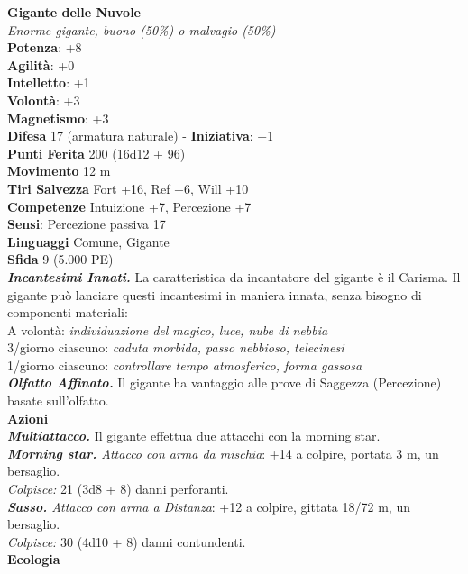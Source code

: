 \begin{multicols}{2}
\medskip\textbf{Gigante delle Nuvole}\\
\emph{Enorme gigante, buono (50\%) o malvagio (50\%)}\\
\textbf{Potenza}: +8 \\
\textbf{Agilità}: +0\\
\textbf{Intelletto}: +1\\
\textbf{Volontà}: +3\\
\textbf{Magnetismo}: +3\\
\textbf{Difesa} 17 (armatura naturale) - \textbf{Iniziativa}: +1\\
\textbf{Punti Ferita} 200 (16d12 + 96)\\
\textbf{Movimento} 12 m\\
\textbf{Tiri Salvezza} Fort +16, Ref +6, Will +10\\
\textbf{Competenze} Intuizione +7, Percezione +7\\
\textbf{Sensi}: Percezione passiva 17\\
\textbf{Linguaggi} Comune, Gigante\\
\textbf{Sfida} 9 (5.000 PE)\smallskip\\
\emph{\textbf{Incantesimi Innati.}} La caratteristica da incantatore del gigante è il Carisma. Il gigante può lanciare questi incantesimi in maniera innata, senza bisogno di componenti materiali:\\
A volontà: \emph{individuazione del magico, luce, nube di nebbia}\\
3/giorno ciascuno: \emph{caduta morbida, passo nebbioso, telecinesi}\\
1/giorno ciascuno: \emph{controllare tempo atmosferico, forma gassosa}\\
\emph{\textbf{Olfatto Affinato.}} Il gigante ha vantaggio alle prove di Saggezza (Percezione) basate sull'olfatto.\\
\smallskip\textbf{Azioni}\\
\emph{\textbf{Multiattacco.}} Il gigante effettua due attacchi con la morning star.\\
\emph{\textbf{Morning star.} Attacco con arma da mischia}: +14 a colpire, portata 3 m, un bersaglio.\\
\emph{Colpisce:} 21 (3d8 + 8) danni perforanti.\\
\emph{\textbf{Sasso.} Attacco con arma a Distanza}: +12 a colpire, gittata 18/72 m, un bersaglio.\\
\emph{Colpisce:} 30 (4d10 + 8) danni contundenti.\\
\textbf{Ecologia}\\

\end{multicols}
